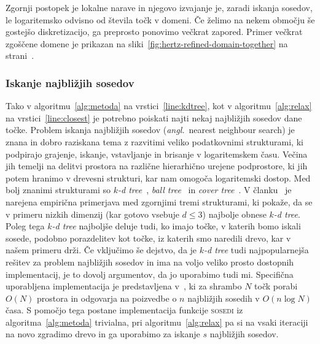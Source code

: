 \documentclass[12pt,a4paper,twoside]{article}
\theoremstyle{definition} %
\theoremstyle{plain} %
\numberwithin{equation}{section}
\newcommand{\ang}[1]{(\textit{angl.}\ #1)}
\begin{document}
Zgornji postopek je lokalne narave in njegovo izvajanje je, zaradi iskanja sosedov, le logaritemsko
odvisno od števila točk v domeni. Če želimo na nekem območju še gostejšo diskretizacijo, ga
preprosto ponovimo večkrat zapored. Primer večkrat zgoščene domene je prikazan na
sliki~\ref{fig:hertz-refined-domain-together} na strani~\pageref{fig:hertz-refined-domain-together}.

\subsubsection{Iskanje najbližjih sosedov}

Tako v algoritmu~\ref{alg:metoda} na vrstici~\ref{line:kdtree}, kot v algoritmu~\ref{alg:relax} na
vrstici~\ref{line:closest} je potrebno poiskati najti nekaj najbližjih sosedov dane točke.  Problem
iskanja najbližjih sosedov \ang{nearest neighbour search} je znana in dobro raziskana tema z
razvitimi veliko podatkovnimi strukturami, ki podpirajo grajenje, iskanje, vstavljanje in brisanje v
logaritemskem času. Večina jih temelji na delitvi prostora na različne hierarhično urejene
podprostore, ki jih potem hranimo v drevesni strukturi, kar nam omogoča logaritemski dostop. Med
bolj znanimi strukturami so \emph{$k$-d tree}~\cite{moore1991intoductory}, \emph{ball
tree}~\cite{omohundro1989five} in \emph{cover tree}~\cite{beygelzimer2006cover}. V
članku~\cite{kibriya2007empirical} je narejena empirična primerjava med zgornjimi tremi strukturami,
ki pokaže, da se v primeru nizkih dimenzij (kar gotovo vsebuje $d \leq 3$) najbolje obnese
\emph{$k$-d tree}. Poleg tega \emph{$k$-d tree} najboljše deluje tudi, ko imajo točke, v katerih
bomo iskali sosede, podobno porazdelitev kot točke, iz katerih smo naredili drevo, kar v našem
primeru drži. Če vključimo še dejstvo, da je \emph{$k$-d tree} tudi najpopularnejša rešitev za
problem najbližjih sosedov in ima na voljo veliko prosto dostopnih implementacij, je to dovolj
argumentov, da jo uporabimo tudi mi. Specifična uporabljena implementacija je predstavljena
v~\cite{mount1998ann}, ki za shrambo $N$ točk porabi $O(N)$ prostora in odgovarja na poizvedbe o $n$
najbližjih sosedih v $O(n\log N)$ časa.  S pomočjo tega postane implementacija funkcije
\textsc{sosedi} iz algoritma~\ref{alg:metoda} trivialna, pri algoritmu~\ref{alg:relax} pa si na
vsaki iteraciji na novo zgradimo drevo in ga uporabimo za iskanje $s$ najbližjih sosedov.
\end{document}
